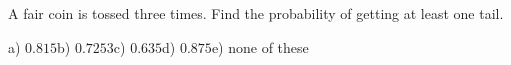 A fair coin is tossed three times. Find the probability of getting at least one tail.

a) $0.815$\quad b) $0.7253$\quad c) $0.635$\quad d) $0.875$\quad e) none of these
